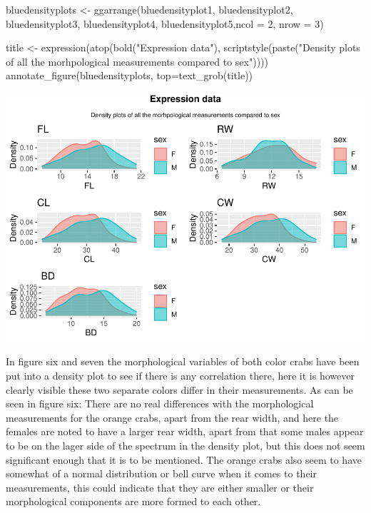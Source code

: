 \documentclass[
]{article}
\newenvironment{Shaded}{}{}
\newcommand{\AttributeTok}[1]{#1}
\newcommand{\DecValTok}[1]{#1}
\newcommand{\FunctionTok}[1]{#1}
\newcommand{\NormalTok}[1]{#1}
\newcommand{\OtherTok}[1]{\textcolor[rgb]{1.00,0.25,0.00}{#1}}
\newcommand{\StringTok}[1]{\textcolor[rgb]{0.00,0.50,0.50}{#1}}
\begin{document}
\begin{Shaded}
\begin{Highlighting}[]
\NormalTok{bluedensityplots }\OtherTok{\textless{}{-}} \FunctionTok{ggarrange}\NormalTok{(bluedensityplot1, bluedensityplot2, bluedensityplot3,}
\NormalTok{                              bluedensityplot4, bluedensityplot5,}\AttributeTok{ncol =} \DecValTok{2}\NormalTok{, }\AttributeTok{nrow =} \DecValTok{3}\NormalTok{)}

\NormalTok{title }\OtherTok{\textless{}{-}} \FunctionTok{expression}\NormalTok{(}\FunctionTok{atop}\NormalTok{(}\FunctionTok{bold}\NormalTok{(}\StringTok{"Expression data"}\NormalTok{), }
        \FunctionTok{scriptstyle}\NormalTok{(}\FunctionTok{paste}\NormalTok{(}\StringTok{"Density plots of all the morhpological measurements compared to sex"}\NormalTok{))))}
\FunctionTok{annotate\_figure}\NormalTok{(bluedensityplots,}
                \AttributeTok{top=}\FunctionTok{text\_grob}\NormalTok{(title))}
\end{Highlighting}
\end{Shaded}

\begin{center}\includegraphics{Log_files/figure-latex/figure 7-1} \end{center}

In figure six and seven the morphological variables of both color crabs
have been put into a density plot to see if there is any correlation
there, here it is however clearly visible these two separate colors
differ in their measurements. As can be seen in figure six: There are no
real differences with the morphological measurements for the orange
crabs, apart from the rear width, and here the females are noted to have
a larger rear width, apart from that some males appear to be on the
lager side of the spectrum in the density plot, but this does not seem
significant enough that it is to be mentioned. The orange crabs also
seem to have somewhat of a normal distribution or bell curve when it
comes to their measurements, this could indicate that they are either
smaller or their morphological components are more formed to each other.
\end{document}
